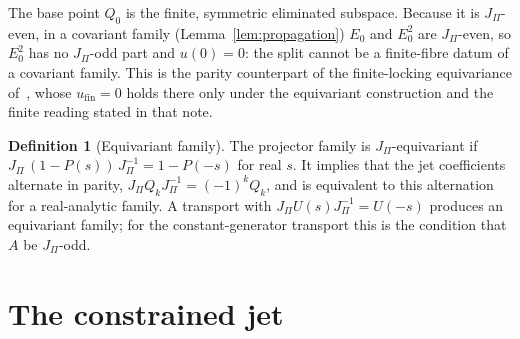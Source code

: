 \documentclass[11pt]{article}
\theoremstyle{definition}
\newtheorem{definition}{Definition}
\theoremstyle{remark}
\newcommand{\JPi}{J_{\Pi}}
\begin{document}
    The base point $Q_0$ is the finite, symmetric eliminated subspace.
    Because it is $\JPi$-even, in a covariant family (Lemma~\ref{lem:propagation}) $E_0$ and $E_0^2$ are
    $\JPi$-even, so $E_0^2$ has no $\JPi$-odd part and $u(0) = 0$: the split cannot be a finite-fibre datum of a
    covariant family.
    This is the parity counterpart of the finite-locking equivariance of~\cite{Beau2026prs}, whose
    $u_{\mathrm{fin}} = 0$ holds there only under the equivariant construction and the finite reading stated in that
    note.

    \begin{definition}[Equivariant family]
      \label{def:equivariant}
      The projector family is $\JPi$-equivariant if $\JPi\,(1-P(s))\,\JPi^{-1} = 1 - P(-s)$ for real $s$.
      It implies that the jet coefficients alternate in parity, $\JPi Q_k \JPi^{-1} = (-1)^k Q_k$, and is equivalent
      to this alternation for a real-analytic family.
      A transport with $\JPi U(s) \JPi^{-1} = U(-s)$ produces an equivariant family; for the constant-generator
      transport
      this is the condition that $A$ be $\JPi$-odd.
    \end{definition}

  \section{The constrained jet}
    \label{sec:jet}
\end{document}
